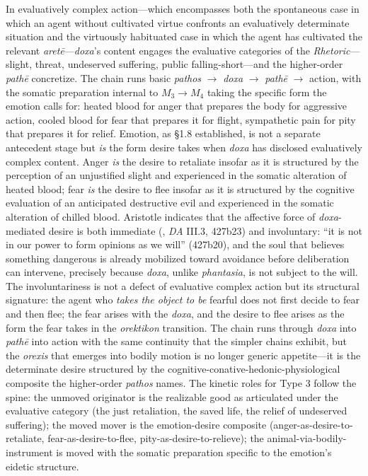 In evaluatively complex action---which encompasses both the spontaneous case in which an agent without cultivated virtue confronts an evaluatively determinate situation and the virtuously habituated case in which the agent has cultivated the relevant \textit{aretē}---\textit{doxa}'s content engages the evaluative categories of the \textit{Rhetoric}---slight, threat, undeserved suffering, public falling-short---and the higher-order \textit{pathē} concretize. The chain runs basic \textit{pathos} $\rightarrow$ \textit{doxa} $\rightarrow$ \textit{pathē} $\rightarrow$ action, with the somatic preparation internal to $M_3 \rightarrow M_4$ taking the specific form the emotion calls for: heated blood for anger that prepares the body for aggressive action, cooled blood for fear that prepares it for flight, sympathetic pain for pity that prepares it for relief. Emotion, as \S 1.8 established, is not a separate antecedent stage but \textit{is} the form desire takes when \textit{doxa} has disclosed evaluatively complex content. Anger \textit{is} the desire to retaliate insofar as it is structured by the perception of an unjustified slight and experienced in the somatic alteration of heated blood; fear \textit{is} the desire to flee insofar as it is structured by the cognitive evaluation of an anticipated destructive evil and experienced in the somatic alteration of chilled blood. Aristotle indicates that the affective force of \textit{doxa}-mediated desire is both immediate (, \textit{DA} III.3, 427b23) and involuntary: ``it is not in our power to form opinions as we will'' (427b20), and the soul that believes something dangerous is already mobilized toward avoidance before deliberation can intervene, precisely because \textit{doxa}, unlike \textit{phantasia}, is not subject to the will. The involuntariness is not a defect of evaluative complex action but its structural signature: the agent who \textit{takes the object to be} fearful does not first decide to fear and then flee; the fear arises with the \textit{doxa}, and the desire to flee arises as the form the fear takes in the \textit{orektikon} transition. The chain runs through \textit{doxa} into \textit{pathē} into action with the same continuity that the simpler chains exhibit, but the \textit{orexis} that emerges into bodily motion is no longer generic appetite---it is the determinate desire structured by the cognitive-conative-hedonic-physiological composite the higher-order \textit{pathos} names. The kinetic roles for Type 3 follow the spine: the unmoved originator is the realizable good as articulated under the evaluative category (the just retaliation, the saved life, the relief of undeserved suffering); the moved mover is the emotion-desire composite (anger-as-desire-to-retaliate, fear-as-desire-to-flee, pity-as-desire-to-relieve); the animal-via-bodily-instrument is moved with the somatic preparation specific to the emotion's eidetic structure.

